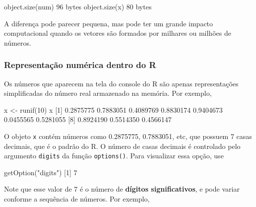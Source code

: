 \documentclass[
  10pt,
  a4paper]{book}
\newenvironment{Shaded}{\begin{snugshade}}{\end{snugshade}}
\newcommand{\DecValTok}[1]{\textcolor[rgb]{0.00,0.00,0.81}{#1}}
\newcommand{\FloatTok}[1]{\textcolor[rgb]{0.00,0.00,0.81}{#1}}
\newcommand{\FunctionTok}[1]{\textcolor[rgb]{0.00,0.00,0.00}{#1}}
\newcommand{\NormalTok}[1]{#1}
\newcommand{\OtherTok}[1]{\textcolor[rgb]{0.56,0.35,0.01}{#1}}
\newcommand{\StringTok}[1]{\textcolor[rgb]{0.31,0.60,0.02}{#1}}
\begin{document}
\begin{Shaded}
\begin{Highlighting}[]
\FunctionTok{object.size}\NormalTok{(num)}
\DecValTok{96}\NormalTok{ bytes}
\FunctionTok{object.size}\NormalTok{(x)}
\DecValTok{80}\NormalTok{ bytes}
\end{Highlighting}
\end{Shaded}

A diferença pode parecer pequena, mas pode ter um grande impacto
computacional quando os vetores são formados por milhares ou milhões de
números.

\hypertarget{representauxe7uxe3o-numuxe9rica-dentro-do-r}{%
\subsubsection{Representação numérica dentro do R}\label{representauxe7uxe3o-numuxe9rica-dentro-do-r}}

Os números que aparecem na tela do console do R são apenas
representações simplificadas do número real armazenado na memória.
Por exemplo,

\begin{Shaded}
\begin{Highlighting}[]
\NormalTok{x }\OtherTok{\textless{}{-}} \FunctionTok{runif}\NormalTok{(}\DecValTok{10}\NormalTok{)}
\NormalTok{x}
\NormalTok{ [}\DecValTok{1}\NormalTok{] }\FloatTok{0.2875775} \FloatTok{0.7883051} \FloatTok{0.4089769} \FloatTok{0.8830174} \FloatTok{0.9404673} \FloatTok{0.0455565} \FloatTok{0.5281055}
\NormalTok{ [}\DecValTok{8}\NormalTok{] }\FloatTok{0.8924190} \FloatTok{0.5514350} \FloatTok{0.4566147}
\end{Highlighting}
\end{Shaded}

O objeto \texttt{x} contém números como 0.2875775, 0.7883051, etc, que possuem 7
casas decimais, que é o padrão do R. O número de casas decimais é
controlado pelo argumento \texttt{digits} da função \texttt{options()}. Para visualizar
essa opção, use

\begin{Shaded}
\begin{Highlighting}[]
\FunctionTok{getOption}\NormalTok{(}\StringTok{"digits"}\NormalTok{)}
\NormalTok{[}\DecValTok{1}\NormalTok{] }\DecValTok{7}
\end{Highlighting}
\end{Shaded}

Note que esse valor de 7 é o número de \textbf{dígitos significativos}, e
pode variar conforme a sequência de números. Por exemplo,
\end{document}
